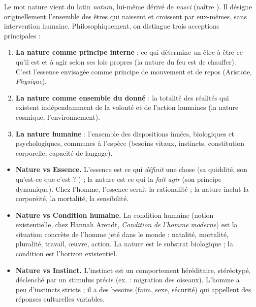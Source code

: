 \documentclass[11pt]{article}
\newcommand{\cle}[1]{{\popxbold\color{popdark}#1}}
\begin{document}
\begin{definition}
Le mot \cle{nature} vient du latin \emph{natura}, lui-même dérivé de \emph{nasci} (\guillemotleft naître \guillemotright). Il désigne originellement l'ensemble des êtres qui naissent et croissent par eux-mêmes, sans intervention humaine. Philosophiquement, on distingue trois acceptions principales :
\begin{enumerate}
\item \textbf{La nature comme principe interne} : ce qui détermine un être à être ce qu'il est et à agir selon ses lois propres (la nature du feu est de chauffer). C'est l'\cle{essence} envisagée comme principe de mouvement et de repos (Aristote, \emph{Physique}).
\item \textbf{La nature comme ensemble du donné} : la totalité des réalités qui existent indépendamment de la volonté et de l'action humaines (la nature cosmique, l'environnement).
\item \textbf{La nature humaine} : l'ensemble des dispositions innées, biologiques et psychologiques, communes à l'espèce (besoins vitaux, instincts, constitution corporelle, capacité de langage).
\end{enumerate}
\end{definition}

\begin{attention}
\begin{itemize}
\item \textbf{Nature vs Essence.} L'essence est ce qui \emph{définit} une chose (sa quiddité, son \guillemotleft qu'est-ce que c'est ? \guillemotright) ; la nature est ce qui la \emph{fait agir} (son principe dynamique). Chez l'homme, l'essence serait la rationalité ; la nature inclut la corporéité, la mortalité, la sensibilité.
\item \textbf{Nature vs Condition humaine.} La \cle{condition humaine} (notion existentielle, chez Hannah Arendt, \emph{Condition de l'homme moderne}) est la situation concrète de l'homme jeté dans le monde : natalité, mortalité, pluralité, travail, œuvre, action. La nature est le substrat biologique ; la condition est l'horizon existentiel.
\item \textbf{Nature vs Instinct.} L'instinct est un comportement héréditaire, stéréotypé, déclenché par un stimulus précis (ex. : migration des oiseaux). L'homme a peu d'instincts stricts ; il a des \cle{besoins} (faim, sexe, sécurité) qui appellent des réponses culturelles variables.
\end{itemize}
\end{attention}
\end{document}
